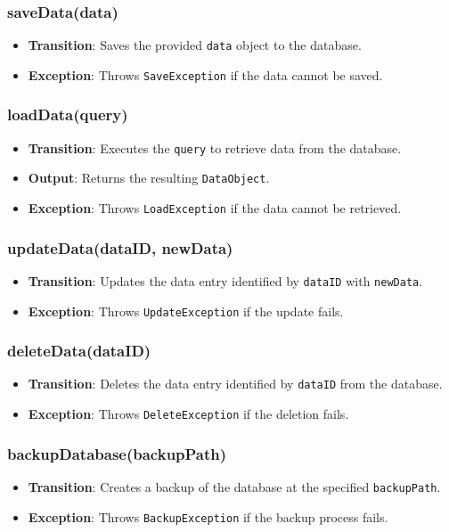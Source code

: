 \documentclass[12pt, titlepage]{article}
\begin{document}
\subsubsection{saveData(data)}
\begin{itemize}
    \item \textbf{Transition}: Saves the provided \texttt{data} object to the database.
    \item \textbf{Exception}: Throws \texttt{SaveException} if the data cannot be saved.
\end{itemize}

\subsubsection{loadData(query)}
\begin{itemize}
    \item \textbf{Transition}: Executes the \texttt{query} to retrieve data from the database.
    \item \textbf{Output}: Returns the resulting \texttt{DataObject}.
    \item \textbf{Exception}: Throws \texttt{LoadException} if the data cannot be retrieved.
\end{itemize}

\subsubsection{updateData(dataID, newData)}
\begin{itemize}
    \item \textbf{Transition}: Updates the data entry identified by \texttt{dataID} with \texttt{newData}.
    \item \textbf{Exception}: Throws \texttt{UpdateException} if the update fails.
\end{itemize}

\subsubsection{deleteData(dataID)}
\begin{itemize}
    \item \textbf{Transition}: Deletes the data entry identified by \texttt{dataID} from the database.
    \item \textbf{Exception}: Throws \texttt{DeleteException} if the deletion fails.
\end{itemize}

\subsubsection{backupDatabase(backupPath)}
\begin{itemize}
    \item \textbf{Transition}: Creates a backup of the database at the specified \texttt{backupPath}.
    \item \textbf{Exception}: Throws \texttt{BackupException} if the backup process fails.
\end{itemize}
\end{document}

